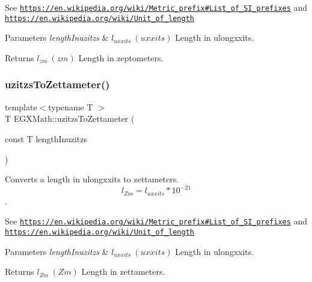 See \href{https://en.wikipedia.org/wiki/Metric_prefix#List_of_SI_prefixes}{\tt https\+://en.\+wikipedia.\+org/wiki/\+Metric\+\_\+prefix\#\+List\+\_\+of\+\_\+\+S\+I\+\_\+prefixes} and \href{https://en.wikipedia.org/wiki/Unit_of_length}{\tt https\+://en.\+wikipedia.\+org/wiki/\+Unit\+\_\+of\+\_\+length} 
\begin{DoxyParams}{Parameters}
{\em length\+Inuzitzs} & $ l_{uxxits}\ (uxxits)$ Length in ulongxxits. \\
\hline
\end{DoxyParams}
\begin{DoxyReturn}{Returns}
$ l_{zm}\ (zm)$ Length in zeptometers. 
\end{DoxyReturn}
\mbox{\label{group___e_g_x_math-_conversions-_length_conversions-uzitzs-_s_i_ga43f793911855da08c6649eb9b059d9c2}} 
\subsubsection{\texorpdfstring{uzitzs\+To\+Zettameter()}{uzitzsToZettameter()}}
{\footnotesize\ttfamily template$<$typename T $>$ \\
T E\+G\+X\+Math\+::uzitzs\+To\+Zettameter (\begin{DoxyParamCaption}\item[{const T}]{length\+Inuzitzs }\end{DoxyParamCaption})}



Converts a length in ulongxxits to zettameters. \[ l_{Zm}=l_{uxxits} * 10^{-21} \]. 

See \href{https://en.wikipedia.org/wiki/Metric_prefix#List_of_SI_prefixes}{\tt https\+://en.\+wikipedia.\+org/wiki/\+Metric\+\_\+prefix\#\+List\+\_\+of\+\_\+\+S\+I\+\_\+prefixes} and \href{https://en.wikipedia.org/wiki/Unit_of_length}{\tt https\+://en.\+wikipedia.\+org/wiki/\+Unit\+\_\+of\+\_\+length} 
\begin{DoxyParams}{Parameters}
{\em length\+Inuzitzs} & $ l_{uxxits}\ (uxxits)$ Length in ulongxxits. \\
\hline
\end{DoxyParams}
\begin{DoxyReturn}{Returns}
$ l_{Zm}\ (Zm)$ Length in zettameters. 
\end{DoxyReturn}
